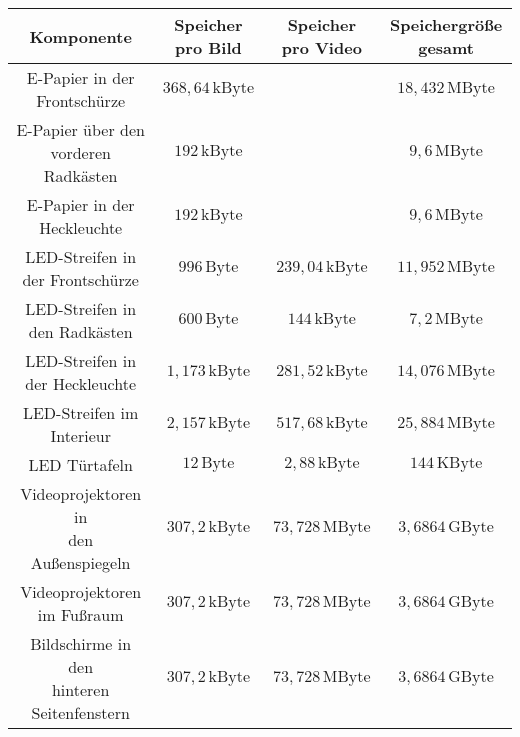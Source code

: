 \begin{table}[hbt]	
	\centering
	\renewcommand{\arraystretch}{1.5}	%
	\label{tab:Werte}
	\begin{tabular}{c|ccc}
		\textbf{Komponente} & \parbox[t]{0.18\linewidth}{\centering Speicher pro Bild} & \parbox[t]{0.18\linewidth}{\centering Speicher pro Video} &\parbox[t]{0.18\linewidth}{\centering Speichergröße gesamt} \\ 
		\hline 
		\hline 
		\parbox[t]{0.3\linewidth}{\centering E-Papier in der Frontschürze} & $ 368,64\,\mathrm{kByte} $ && $ 18,432\,\mathrm{MByte} $  \\
		\parbox[t]{0.3\linewidth}{\centering E-Papier über den vorderen Radkästen} & $ 192\,\mathrm{kByte} $ && $ 9,6\,\mathrm{MByte} $ \\
		\parbox[t]{0.3\linewidth}{\centering E-Papier in der Heckleuchte} & $ 192\,\mathrm{kByte} $ && $ 9,6\,\mathrm{MByte} $ \\
		\parbox[t]{0.3\linewidth}{\centering LED-Streifen in der Frontschürze} & $ 996\,\mathrm{Byte} $ & $ 239,04\,\mathrm{kByte} $ & $ 11,952\,\mathrm{MByte} $ \\
		\parbox[t]{0.3\linewidth}{\centering LED-Streifen in den Radkästen} & $ 600\,\mathrm{Byte} $ & $ 144\,\mathrm{kByte} $ & $ 7,2\,\mathrm{MByte} $ \\ 
		\parbox[t]{0.3\linewidth}{\centering LED-Streifen in der Heckleuchte} & $ 1,173\,\mathrm{kByte} $ & $ 281,52\,\mathrm{kByte} $ & $ 14,076\,\mathrm{MByte} $ \\ 
		\parbox[t]{0.3\linewidth}{\centering LED-Streifen im Interieur} & $ 2,157\,\mathrm{kByte} $ & $ 517,68\,\mathrm{kByte} $ &$ 25,884\,\mathrm{MByte} $ \\
		\parbox[t]{0.3\linewidth}{\centering LED Türtafeln} & $ 12\,\mathrm{Byte} $ & $ 2,88\,\mathrm{kByte} $ & $ 144\,\mathrm{KByte} $ \\
		\parbox[t]{0.3\linewidth}{\centering Videoprojektoren in\\den Außenspiegeln} & $ 307,2\,\mathrm{kByte} $ & $ 73,728\,\mathrm{MByte} $ & $ 3,6864\,\mathrm{GByte} $ \\ 
		\parbox[t]{0.3\linewidth}{\centering Videoprojektoren im Fußraum} & $ 307,2\,\mathrm{kByte} $ & $ 73,728\,\mathrm{MByte} $ &$ 3,6864\,\mathrm{GByte} $ \\
		\parbox[t]{0.3\linewidth}{\centering Bildschirme in den\\hinteren Seitenfenstern} & $ 307,2\,\mathrm{kByte} $ & $ 73,728\,\mathrm{MByte} $ & $ 3,6864\,\mathrm{GByte} $ \\

\end{tabular}
\end{table}
